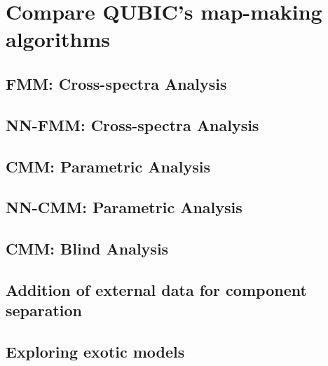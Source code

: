 \documentclass[../../thesis.tex]{subfiles}
\begin{document}
\section{Compare QUBIC's map-making algorithms}

\subsection{FMM: Cross-spectra Analysis}

\subsection{NN-FMM: Cross-spectra Analysis}

\subsection{CMM: Parametric Analysis}

\subsection{NN-CMM: Parametric Analysis}

\subsection{CMM: Blind Analysis}

\subsection{Addition of external data for component separation}

\subsection{Exploring exotic models}
\end{document}
